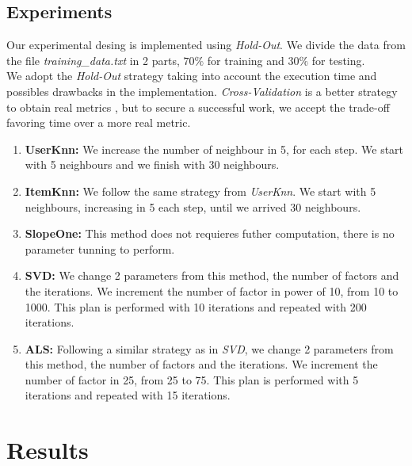 \documentclass[letterpaper, 10 pt, conference]{ieeeconf}  %
\begin{document}
\begin{enumerate}
\end{enumerate}

\subsection{Experiments}

Our experimental desing is implemented using \textit{Hold-Out}. We divide the data from the file \textit{training\_data.txt} in 2 parts, $70\%$ for training and $30\%$ for testing.\\
We adopt the \textit{Hold-Out} strategy taking into account the execution time and possibles drawbacks in the implementation. \textit{Cross-Validation} is a better strategy to obtain real metrics \cite{c6}, but to secure a successful work, we accept the trade-off favoring time over a more real metric.\\

\begin{enumerate}

    \item \textbf{UserKnn: }
    We increase the number of neighbour in 5, for each step. We start with 5 neighbours and we finish with 30 neighbours.
    
    \item \textbf{ItemKnn: } We follow the same strategy from \textit{UserKnn}. We start with 5 neighbours, increasing in 5 each step, until we arrived 30 neighbours.
    
    \item \textbf{SlopeOne: } This method does not requieres futher computation, there is no parameter tunning to perform.
    
    \item \textbf{SVD: } We change 2 parameters from this method, the number of factors and the iterations. We increment the number of factor in power of 10, from 10 to 1000. This plan is performed with 10 iterations and repeated with 200 iterations. 
    
    \item \textbf{ALS: } Following a similar strategy as in \textit{SVD}, we change 2 parameters from this method, the number of factors and the iterations. We increment the number of factor in 25, from 25 to 75. This plan is performed with 5 iterations and repeated with 15 iterations.
    
\end{enumerate}


\section{Results}
\end{document}
